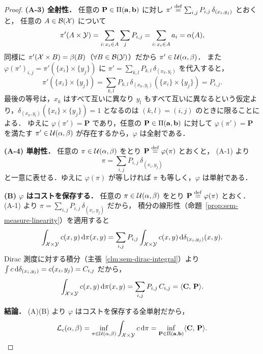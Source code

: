 \begin{proof}
  \medskip
  \textbf{(A-3) 全射性．}
  任意の $\mathbf{P} \in \Pi(\mathbf{a},\mathbf{b})$ に対し
  $\pi' \overset{\mathrm{def}}{=} \sum_{i,j} P_{i,j}\,\delta_{(x_i,y_j)}$ とおくと，
  任意の $A \in \mathcal{B}(\mathcal{X})$ について
  \[
    \pi'(A \times \mathcal{Y})
    = \sum_{i:\,x_i \in A} \sum_j P_{i,j}
    = \sum_{i:\,x_i \in A} a_i
    = \alpha(A),
  \]
  同様に $\pi'(\mathcal{X} \times B) = \beta(B)$（$\forall B \in \mathcal{B}(\mathcal{Y})$）だから
  $\pi' \in \mathcal{U}(\alpha,\beta)$．
  また $\varphi(\pi')_{i,j} = \pi'(\{x_i\} \times \{y_j\})$ に $\pi' = \sum_{k,l} P_{k,l}\,\delta_{(x_k,y_l)}$ を代入すると，
  \[
    \pi'(\{x_i\} \times \{y_j\})
    = \sum_{k,l} P_{k,l}\,\delta_{(x_k,y_l)}(\{x_i\} \times \{y_j\})
    = P_{i,j}.
  \]
  最後の等号は，$x_k$ はすべて互いに異なり $y_l$ もすべて互いに異なるという仮定より，$\delta_{(x_k,y_l)}(\{x_i\}\times\{y_j\})=1$ となるのは $(k,l)=(i,j)$ のときに限ることによる．
  ゆえに $\varphi(\pi') = \mathbf{P}$ であり，任意の $\mathbf{P} \in \Pi(\mathbf{a},\mathbf{b})$ に対して $\varphi(\pi') = \mathbf{P}$ を満たす $\pi' \in \mathcal{U}(\alpha,\beta)$ が存在するから，$\varphi$ は全射である．

  \medskip
  \textbf{(A-4) 単射性．}
  任意の $\pi \in \mathcal{U}(\alpha,\beta)$ をとり $\mathbf{P} \overset{\mathrm{def}}{=} \varphi(\pi)$ とおくと，
  (A-1) より
  \[
    \pi = \sum_{i,j} P_{i,j}\,\delta_{(x_i,y_j)}
  \]
  と一意に表せる．ゆえに $\varphi(\pi)$ が等しければ $\pi$ も等しく，$\varphi$ は単射である．

  \medskip
  \textbf{(B) $\varphi$ はコストを保存する．}
  任意の $\pi \in \mathcal{U}(\alpha,\beta)$ をとり $\mathbf{P} \overset{\mathrm{def}}{=} \varphi(\pi)$ とおく．
  (A-1) より $\pi = \sum_{i,j} P_{i,j}\,\delta_{(x_i,y_j)}$ だから，
  積分の線形性（命題~\ref{prop:sem-measure-linearity}）を適用すると
  \[
    \int_{\mathcal{X} \times \mathcal{Y}} c(x, y)\, \mathrm{d}\pi(x, y)
    = \sum_{i,j} P_{i,j} \int_{\mathcal{X} \times \mathcal{Y}} c(x, y)\, \mathrm{d}\delta_{(x_i,y_j)}(x,y).
  \]
  Dirac 測度に対する積分（主張~\ref{clm:sem-dirac-integral}）より
  $\int c\,\mathrm{d}\delta_{(x_i,y_j)} = c(x_i,y_j) = C_{i,j}$ だから，
  \[
    \int_{\mathcal{X} \times \mathcal{Y}} c(x, y)\, \mathrm{d}\pi(x, y)
    = \sum_{i,j} P_{i,j}\, C_{i,j}
    = \langle \mathbf{C},\, \mathbf{P} \rangle.
  \]

  \medskip
  \textbf{結論．}
  (A)(B) より $\varphi$ はコストを保存する全単射だから，
  \[
    \mathcal{L}_c(\alpha, \beta)
    = \inf_{\pi \in \mathcal{U}(\alpha, \beta)}
      \int_{\mathcal{X} \times \mathcal{Y}} c\, \mathrm{d}\pi
    = \inf_{\mathbf{P} \in \Pi(\mathbf{a}, \mathbf{b})}
      \langle \mathbf{C},\, \mathbf{P} \rangle.
  \]
\end{proof}

